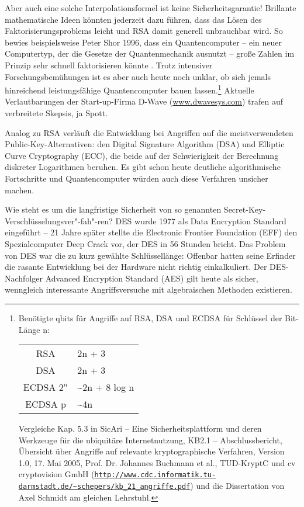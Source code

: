 \begin{refsegment}
Aber auch eine solche Interpolationsformel ist keine
Sicherheitsgarantie! Brillante mathematische Ideen könnten jederzeit
dazu führen, dass das Lösen des Faktorisierungsproblems leicht
und RSA damit generell unbrauchbar wird. So bewies beispielsweise Peter
Shor 1996, dass ein Quantencomputer -- ein neuer Computertyp, der die
Gesetze der Quantenmechanik ausnutzt -- große Zahlen im Prinzip sehr
schnell faktorisieren könnte \cite{shor:1997}. Trotz intensiver
Forschungsbemühungen ist es aber auch heute noch unklar, ob sich jemals
hinreichend leistungsfähige Quantencomputer
bauen lassen.\footnote{%
Benötigte qbits für Angriffe auf RSA, DSA und ECDSA für Schlüssel
der Bit-Länge n:
\begin{center}
\begin{tabular}{|c|l|}
\hline
   RSA		&  2n + 3 \\
   DSA		&  2n + 3 \\
   ECDSA $2^n$	&  \~{}2n + 8 log n \\
   ECDSA p	&  \~{}4n \\
\hline
\end{tabular}
\end{center}
Vergleiche Kap. 5.3 in
\glqq SicAri -- Eine Sicherheitsplattform und deren Werkzeuge
für die ubiquitäre Internetnutzung, KB2.1 -- Abschlussbericht,
Übersicht über Angriffe auf relevante kryptographische Verfahren\grqq,
Version 1.0, 17. Mai 2005,
Prof. Dr. Johannes Buchmann et al., TUD-KryptC und cv cryptovision GmbH
(\href{http://www.cdc.informatik.tu-darmstadt.de/~schepers/kb\_21\_angriffe.pdf}
 {\tt http://www.cdc.informatik.tu-darmstadt.de/\~{}schepers/kb\_21\_angriffe.pdf})
und die Dissertation von Axel Schmidt am gleichen Lehrstuhl.
}
Aktuelle Verlautbarungen der Start-up-Firma D-Wave (\url{www.dwavesys.com})
trafen auf verbreitete Skepsis, ja Spott.

Analog zu RSA verläuft die Entwicklung bei Angriffen
auf die meistverwendeten Public-Key-Alternativen:
den Digital Signature Algorithm (DSA) und Elliptic Curve
Cryptography (ECC), die beide auf der Schwierigkeit
der Berechnung diskreter Logarithmen beruhen. Es gibt
schon heute deutliche algorithmische Fortschritte und
Quantencomputer würden auch diese Verfahren unsicher
machen.

Wie steht es um die langfristige Sicherheit von so genannten
Secret-Key-Verschlüsselungsver"-fah"-ren? DES wurde 1977 als Data Encryption
Standard eingeführt \cite{DES-Standard:1977} -- 21 Jahre später stellte
die Electronic Frontier Foundation (EFF) den Spezialcomputer Deep Crack
vor, der DES in 56 Stunden bricht. Das Problem von DES war die zu kurz
gewählte Schlüssellänge: Offenbar hatten seine Erfinder die rasante
Entwicklung bei der Hardware nicht richtig einkalkuliert. Der
DES-Nachfolger Advanced Encryption Standard (AES)
\cite{AES-Standard:2002} gilt heute als sicher, wenngleich interessante
Angriffsversuche mit algebraischen Methoden existieren.



\end{refsegment}
